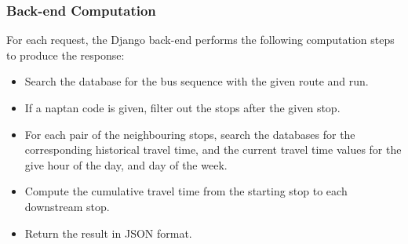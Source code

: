 \subsubsection{Back-end Computation}
For each request, the Django back-end performs the following computation steps to produce the response:

\begin{itemize}
  \item Search the database for the bus sequence with the given route and run.
  \item If a \gls{naptan} code is given, filter out the stops after the given stop.
  \item For each pair of the neighbouring stops, search the databases for the corresponding historical travel time, and the current travel time values for the give hour of the day, and day of the week.
  \item Compute the cumulative travel time from the starting stop to each downstream stop.
  \item Return the result in JSON format.
\end{itemize}
